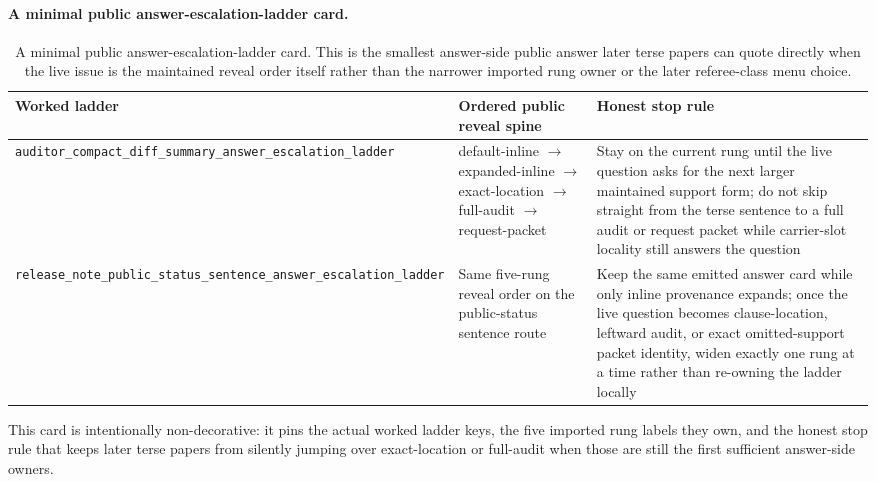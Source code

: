 \documentclass[11pt]{article}
\begin{document}
\paragraph{A minimal public answer-escalation-ladder card.}
\begin{table}[t]
\centering
\small
\begin{tabularx}{\linewidth}{@{}l l X@{}}
\toprule
Worked ladder & Ordered public reveal spine & Honest stop rule \\
\midrule
\nolinkurl{auditor_compact_diff_summary_answer_escalation_ladder} & \textsf{default-inline} $\to$ \textsf{expanded-inline} $\to$ \textsf{exact-location} $\to$ \textsf{full-audit} $\to$ \textsf{request-packet} & Stay on the current rung until the live question asks for the next larger maintained support form; do not skip straight from the terse sentence to a full audit or request packet while carrier-slot locality still answers the question \\
\nolinkurl{release_note_public_status_sentence_answer_escalation_ladder} & Same five-rung reveal order on the public-status sentence route & Keep the same emitted answer card while only inline provenance expands; once the live question becomes clause-location, leftward audit, or exact omitted-support packet identity, widen exactly one rung at a time rather than re-owning the ladder locally \\
\bottomrule
\end{tabularx}
\caption{A minimal public answer-escalation-ladder card. This is the smallest answer-side public answer later terse papers can quote directly when the live issue is the maintained reveal order itself rather than the narrower imported rung owner or the later referee-class menu choice.}
\label{tab:minimal-public-answer-escalation-ladder-card}
\end{table}

This card is intentionally non-decorative: it pins the actual worked ladder keys, the five imported rung labels they own, and the honest stop rule that keeps later terse papers from silently jumping over exact-location or full-audit when those are still the first sufficient answer-side owners.\cite{series:workedexample}
\end{document}

